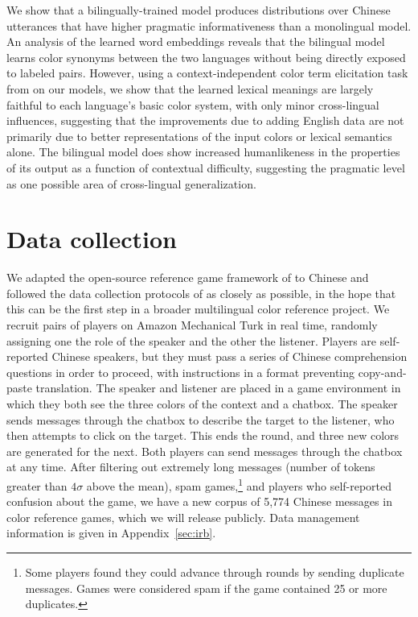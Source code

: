 \documentclass[11pt,a4paper]{article}
\renewcommand{\|}{\mid}
\begin{document}
We show that a bilingually-trained model produces distributions over Chinese utterances that have higher pragmatic informativeness than a monolingual model.
An analysis of the learned word embeddings reveals that the bilingual model learns color synonyms between the two languages without being directly exposed to labeled pairs. However, using a context-independent color term elicitation task from \citet{BerlinKay1969} on our models, we show that the learned lexical meanings are largely faithful to each language's basic color system, with only minor cross-lingual influences, suggesting
that the improvements due to adding English data are not
primarily due to better representations of the input colors or lexical semantics alone.
The bilingual model does show increased humanlikeness in the properties of its output 
as a function of contextual difficulty, suggesting the
pragmatic level as one possible area of cross-lingual generalization.


\section{Data collection} \label{sec:data}

We adapted the open-source reference game framework of \citet{Hawkins15_RealTimeWebExperiments} to Chinese and followed the data collection protocols of \citet{Monroe2017} as closely as possible, in the hope that this can be the first step in a broader multilingual color reference project. We recruit pairs of players on Amazon Mechanical Turk in real time, randomly assigning one the role of the speaker and the other the listener. Players are self-reported Chinese speakers, but they must pass a series of Chinese comprehension questions in order to proceed, with instructions in a format preventing copy-and-paste translation. The speaker and listener are placed in a game environment in which they both see the three colors of the context and a chatbox. The speaker sends messages through the chatbox to describe the target to the listener, who then attempts to click on the target. This ends the round, and three new colors are generated for the next. Both players can send messages through the chatbox at any time. After filtering out extremely long messages (number of tokens greater than $4\sigma$ above the mean), spam games,\footnote{Some players found they could advance through rounds by sending duplicate messages. Games were considered spam if the game contained 25 or more duplicates.} and players who self-reported confusion about the game, we have a new corpus of 5,774 Chinese messages in color reference games, which we will release publicly. Data management information is given in Appendix~\ref{sec:irb}.
\end{document}
